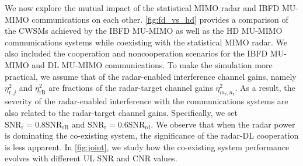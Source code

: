 \documentclass[9pt,journal]{IEEEtran}
\newcommand{\paren}[1]{\left({#1}\right)}
\newcommand{\rr}{_\mathrm{r}}
\theoremstyle{definition}
\begin{document}

We now explore the mutual impact of the statistical MIMO radar and IBFD MU-MIMO communications on each other. \figurename{\;\ref{fig:fd_vs_hd}} provides a comparison of the CWSMs achieved by the IBFD MU-MIMO as well as the HD MU-MIMO communications systems while coexisting with the statistical MIMO radar. We also included the cooperation and noncooperation scenarios for the IBFD MU-MIMO and DL MU-MIMO communications. To make the simulation more practical, we assume that of the radar-enabled interference channel gains, namely $\eta^2_{\mathrm{r},j}$ and $\eta^2_{\mathrm{rB}}$ are fractions of the radar-target channel gains $\eta^2_{m\rr,n\rr}$. As a result, the severity of the radar-enabled interference with the communications systems are also related to the radar-target channel gains. Specifically, we set $\mathrm{SNR}_{\textrm{r}}=0.8\mathrm{SNR}_{\textrm{rB}}$ and $\mathrm{SNR}_{\textrm{r}}=0.6\mathrm{SNR}_{\textrm{rd}}$. We observe that when the radar power is dominating the co-existing system, the significance of the radar-DL cooperation is less apparent. In \figurename{\;\ref{fig:joint}}, we study how the co-existing system performance evolves with different UL SNR and CNR values.  %
\end{document}
